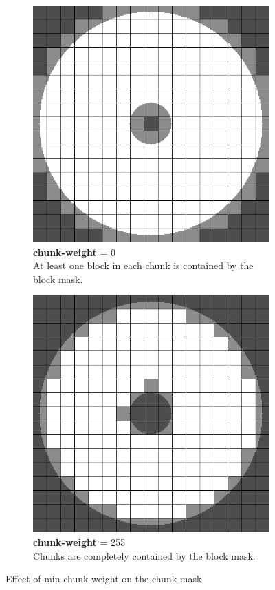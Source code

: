 \documentclass[12pt]{article}
\begin{document}
\begin{figure}[H]
\begin{subfigure}{0.5\textwidth}
\includegraphics[width=.9\linewidth]{chunk-weight=0.png}
\captionsetup{width=.8\linewidth}
\caption*{\textbf{chunk-weight} = 0\\
At least one block in each chunk is contained by the block mask.}
\end{subfigure}%
\begin{subfigure}{0.5\textwidth}
\centering
\includegraphics[width=.9\linewidth]{chunk-weight=255.png}
\captionsetup{width=.8\linewidth}
\caption*{\textbf{chunk-weight} = 255\\
Chunks are completely contained by the block mask.}
\end{subfigure}
\caption{Effect of min-chunk-weight on the chunk mask}
\label{fig:chunk-mask}
\end{figure}
\end{document}
